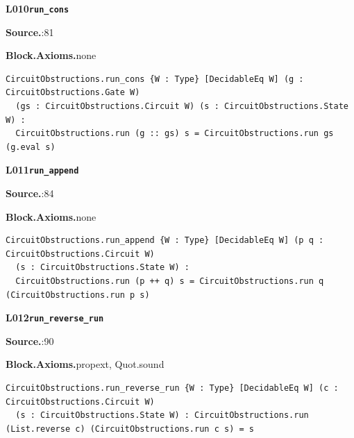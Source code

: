 \par\medskip\noindent\begin{minipage}{\textwidth}
{\small\bfseries L010\enspace\texttt{run\_cons}\par}
{\footnotesize\raggedright\textbf{Source.}\enspace{}:81\par
\textbf{Block.}\quad\textbf{Axioms.}\enspace none\par}\nopagebreak
\begin{lstlisting}
CircuitObstructions.run_cons {W : Type} [DecidableEq W] (g : CircuitObstructions.Gate W)
  (gs : CircuitObstructions.Circuit W) (s : CircuitObstructions.State W) :
  CircuitObstructions.run (g :: gs) s = CircuitObstructions.run gs (g.eval s)
\end{lstlisting}
\end{minipage}\par

\par\medskip\noindent\begin{minipage}{\textwidth}
{\small\bfseries L011\enspace\texttt{run\_append}\par}
{\footnotesize\raggedright\textbf{Source.}\enspace{}:84\par
\textbf{Block.}\quad\textbf{Axioms.}\enspace none\par}\nopagebreak
\begin{lstlisting}
CircuitObstructions.run_append {W : Type} [DecidableEq W] (p q : CircuitObstructions.Circuit W)
  (s : CircuitObstructions.State W) :
  CircuitObstructions.run (p ++ q) s = CircuitObstructions.run q (CircuitObstructions.run p s)
\end{lstlisting}
\end{minipage}\par

\par\medskip\noindent\begin{minipage}{\textwidth}
{\small\bfseries L012\enspace\texttt{run\_reverse\_run}\par}
{\footnotesize\raggedright\textbf{Source.}\enspace{}:90\par
\textbf{Block.}\quad\textbf{Axioms.}\enspace propext, Quot.sound\par}\nopagebreak
\begin{lstlisting}
CircuitObstructions.run_reverse_run {W : Type} [DecidableEq W] (c : CircuitObstructions.Circuit W)
  (s : CircuitObstructions.State W) : CircuitObstructions.run (List.reverse c) (CircuitObstructions.run c s) = s
\end{lstlisting}
\end{minipage}\par

